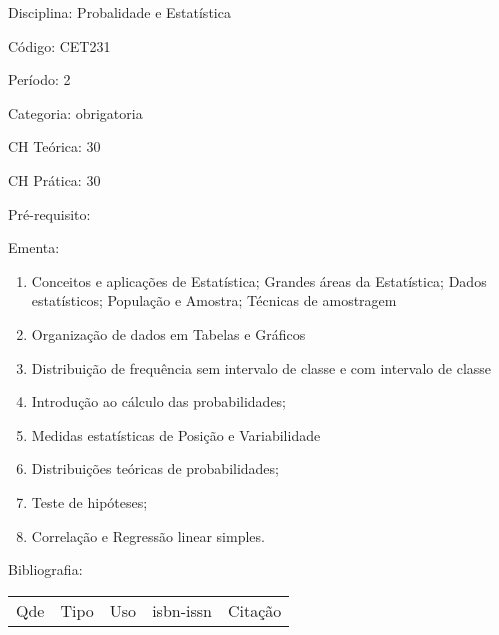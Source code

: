 \documentclass[12pt,a4paper,twoside]{report}
\begin{document}
Disciplina: Probalidade e Estatística

Código: CET231

Período: 2

Categoria: obrigatoria

CH Teórica: 30

CH Prática: 30




Pré-requisito:
\begin{enumerate}
\end{enumerate}

Ementa:
\begin{enumerate}
\item Conceitos e aplicações de Estatística; Grandes áreas da Estatística; Dados estatísticos; População e Amostra; Técnicas de amostragem
\item Organização de dados em Tabelas e Gráficos
\item Distribuição de frequência sem intervalo de classe e com intervalo de classe
\item Introdução ao cálculo das probabilidades;
\item Medidas estatísticas de Posição e Variabilidade
\item Distribuições teóricas de probabilidades;
\item Teste de hipóteses;
\item Correlação e Regressão linear simples.
\end{enumerate}



Bibliografia:


\begin{tabular}{llllp{8cm}}
Qde & Tipo & Uso & isbn-issn & Citação \\
\end{tabular}
\end{document}
